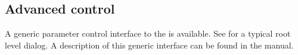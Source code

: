 \documentclass[11pt,a4paper,twoside]{article}
\newcommand{\+}{\discretionary{\mbox{\scriptsize$\hookleftarrow$}}{}{}}
\begin{document}
%
%
%
%
%
%
%
%
%

\subsection{Advanced control}\label{sec:advanced}

A generic parameter control interface to the \mha{} is available. See
 for a typical root level dialog.
%
A description of this generic interface can be found in the \mha{}
manual.




\printindex
\end{document}
